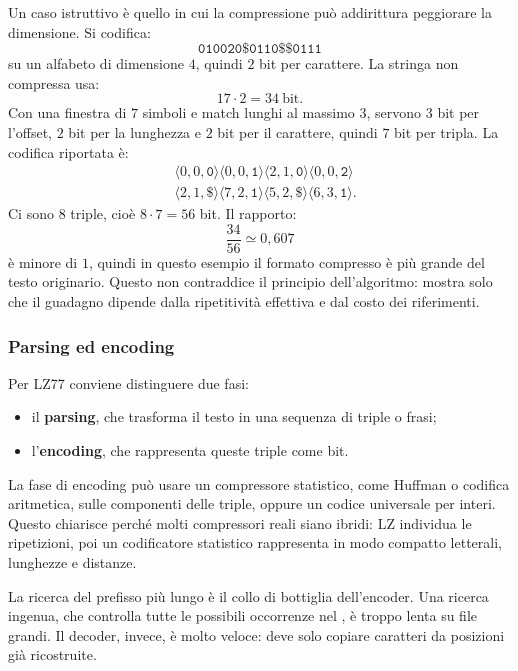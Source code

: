 \documentclass{article}
\theoremstyle{definition}
\numberwithin{equation}{section}
\begin{document}
Un caso istruttivo è quello in cui la compressione può addirittura peggiorare la dimensione. Si codifica:
\[
    \texttt{010020\$0110\$\$0111}
\]
su un alfabeto di dimensione $4$, quindi $2$ bit per carattere. La stringa non compressa usa:
\[
    17\cdot 2=34\ \text{bit}.
\]
Con una finestra di $7$ simboli e match lunghi al massimo $3$, servono $3$ bit per l'offset, $2$ bit per la lunghezza e $2$ bit per il carattere, quindi $7$ bit per tripla. La codifica riportata è:
\[
    \begin{aligned}
         & \langle 0,0,\texttt{0}\rangle
        \langle 0,0,\texttt{1}\rangle
        \langle 2,1,\texttt{0}\rangle
        \langle 0,0,\texttt{2}\rangle     \\
         & \langle 2,1,\texttt{\$}\rangle
        \langle 7,2,\texttt{1}\rangle
        \langle 5,2,\texttt{\$}\rangle
        \langle 6,3,\texttt{1}\rangle.
    \end{aligned}
\]
Ci sono $8$ triple, cioè $8\cdot 7=56$ bit. Il rapporto:
\[
    \frac{34}{56}\simeq 0{,}607
\]
è minore di $1$, quindi in questo esempio il formato compresso è più grande del testo originario. Questo non contraddice il principio dell'algoritmo: mostra solo che il guadagno dipende dalla ripetitività effettiva e dal costo dei riferimenti.

\subsubsection{Parsing ed encoding}
Per LZ77 conviene distinguere due fasi:
\begin{itemize}
    \item il \textbf{parsing}, che trasforma il testo in una sequenza di triple o frasi;
    \item l'\textbf{encoding}, che rappresenta queste triple come bit.
\end{itemize}
La fase di encoding può usare un compressore statistico, come Huffman o codifica aritmetica, sulle componenti delle triple, oppure un codice universale per interi. Questo chiarisce perché molti compressori reali siano ibridi: LZ individua le ripetizioni, poi un codificatore statistico rappresenta in modo compatto letterali, lunghezze e distanze.

La ricerca del prefisso più lungo è il collo di bottiglia dell'encoder. Una ricerca ingenua, che controlla tutte le possibili occorrenze nel , è troppo lenta su file grandi. Il decoder, invece, è molto veloce: deve solo copiare caratteri da posizioni già ricostruite.
\end{document}
